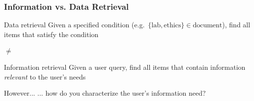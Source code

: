 \documentclass[svgnames]{beamer}
\begin{document}
\begin{frame}
  \frametitle{Information vs. Data Retrieval}

  \begin{block}{Data retrieval}
    Given a specified condition (e.g.~$\{\text{lab}, \text{ethics}\} \in
    \text{document}$), find all items that satisfy the condition
  \end{block}

  \begin{center}
    {\Huge $\neq$}
  \end{center}

  \begin{block}{Information retrieval}
    Given a user query, find all items that contain information
    \emph{relevant} to the user's needs
  \end{block}

  \pause

  \begin{block}{However...}
    ... how do you characterize the \alert{user's information need}?
  \end{block}


\end{frame}

\end{document}
